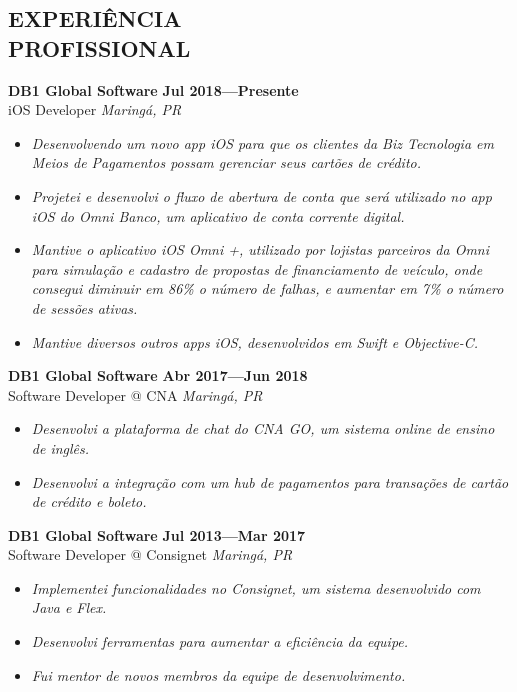 \documentclass[line,margin]{res}
\begin{document}


\address{\sl marcosatanaka.com --- marcosatanaka@gmail.com}


\begin{resume}


\section{EXPERIÊNCIA \\ PROFISSIONAL}
  {\bf DB1 Global Software} \hfill {\bf Jul 2018---Presente} \\
  iOS Developer \hfill {\sl Maring\'a, PR}\\[-6pt]
  \begin{itemize}
      \item {\sl Desenvolvendo um novo app iOS para que os clientes da Biz Tecnologia em Meios de Pagamentos possam gerenciar seus cartões de crédito.}
    \item {\sl Projetei e desenvolvi o fluxo de abertura de conta que será utilizado no app iOS do Omni Banco, um aplicativo de conta corrente digital.}
    \item {\sl Mantive o aplicativo iOS Omni +, utilizado por lojistas parceiros da Omni para simulação e cadastro de propostas de financiamento de veículo, onde consegui diminuir em 86\% o número de falhas, e aumentar em 7\% o número de sessões ativas.}
    \item {\sl Mantive diversos outros apps iOS, desenvolvidos em Swift e Objective-C.}
  \end{itemize}

  {\bf DB1 Global Software} \hfill {\bf Abr 2017---Jun 2018} \\
  Software Developer @ CNA \hfill {\sl Maring\'a, PR}\\[-6pt]
  \begin{itemize}
    \item {\sl Desenvolvi a plataforma de chat do CNA GO, um sistema online de ensino de inglês.}
    \item {\sl Desenvolvi a integração com um hub de pagamentos para transações de cartão de crédito e boleto.}
  \end{itemize}

  {\bf DB1 Global Software} \hfill {\bf Jul 2013---Mar 2017} \\
  Software Developer @ Consignet \hfill {\sl Maring\'a, PR}\\[-6pt]
  \begin{itemize}
    \item {\sl Implementei funcionalidades no Consignet, um sistema desenvolvido com Java e Flex.}
    \item {\sl Desenvolvi ferramentas para aumentar a eficiência da equipe.}
    \item {\sl Fui mentor de novos membros da equipe de desenvolvimento.}
  \end{itemize}


\end{resume}
\end{document}
